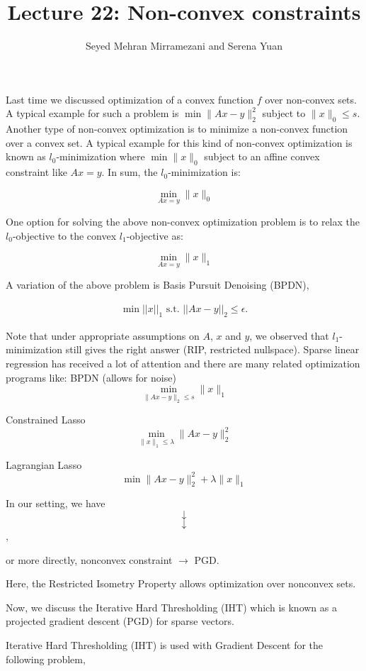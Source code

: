 \documentclass{article}
\title{Lecture 22: Non-convex constraints}
\author{Seyed Mehran Mirramezani and Serena Yuan}
\theoremstyle{definition}
\begin{document}
\maketitle


Last time we discussed optimization of a convex function $f$ over non-convex sets. A typical example for such a problem is $\min \| Ax-y\|_2^2$ subject to $\|x\|_0 \leq s$. Another type of non-convex optimization is to minimize a non-convex function over a convex set. A typical example for this kind of non-convex optimization is known as $l_0$-minimization where $\min \| x\|_0$ subject to an affine convex constraint like $Ax=y$. In sum, the $l_0$-minimization is: 

$$\min_{Ax=y} \|x\|_0$$

One option for solving the above non-convex optimization problem is to relax the $l_0$-objective to the convex $l_1$-objective as:

$$\min_{Ax=y} \|x\|_1$$

A variation of the above problem is Basis Pursuit Denoising (BPDN),

\begin{align}
\min ||x||_1 \text{ s.t. } ||Ax - y||_2 \leq \epsilon.
\end{align}


Note that under appropriate assumptions on $A$, $x$ and $y$, we observed that $l_1$-minimization still gives the right answer (RIP, restricted nullspace).
Sparse linear regression has received a lot of attention and there are many related optimization programs like:
BPDN (allows for noise)
$$\min_{\|Ax-y\|_2 \leq s} \|x\|_1$$

Constrained Lasso
$$\min_{\|x\|_1 \leq \lambda }\|Ax-y\|_2^2 $$

Lagrangian Lasso
$$\min \|Ax-y\|_2^2 +  \lambda \|x\|_1$$

In our setting, we have \\

$$\downarrow$$
$$\downarrow$$
,

or more directly, nonconvex constraint $\rightarrow$ PGD. 

Here, the Restricted Isometry Property allows optimization over nonconvex sets.


Now, we discuss the Iterative Hard Thresholding (IHT) which is known as a projected gradient descent (PGD) for sparse vectors.

Iterative Hard Thresholding (IHT) is used with Gradient Descent for the following problem,
\end{document}
